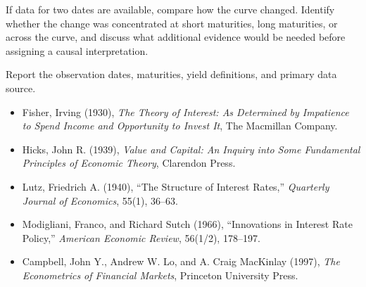If data for two dates are available, compare how the curve changed. Identify whether the change was concentrated at short maturities, long maturities, or across the curve, and discuss what additional evidence would be needed before assigning a causal interpretation.

Report the observation dates, maturities, yield definitions, and primary data source.



\begin{itemize}

\item Fisher, Irving (1930), \emph{The Theory of Interest: As Determined by Impatience to Spend Income and Opportunity to Invest It}, The Macmillan Company.

\item Hicks, John R. (1939), \emph{Value and Capital: An Inquiry into Some Fundamental Principles of Economic Theory}, Clarendon Press.

\item Lutz, Friedrich A. (1940), ``The Structure of Interest Rates,'' \emph{Quarterly Journal of Economics}, 55(1), 36--63.

\item Modigliani, Franco, and Richard Sutch (1966), ``Innovations in Interest Rate Policy,'' \emph{American Economic Review}, 56(1/2), 178--197.

\item Campbell, John Y., Andrew W. Lo, and A. Craig MacKinlay (1997), \emph{The Econometrics of Financial Markets}, Princeton University Press.

\end{itemize}


